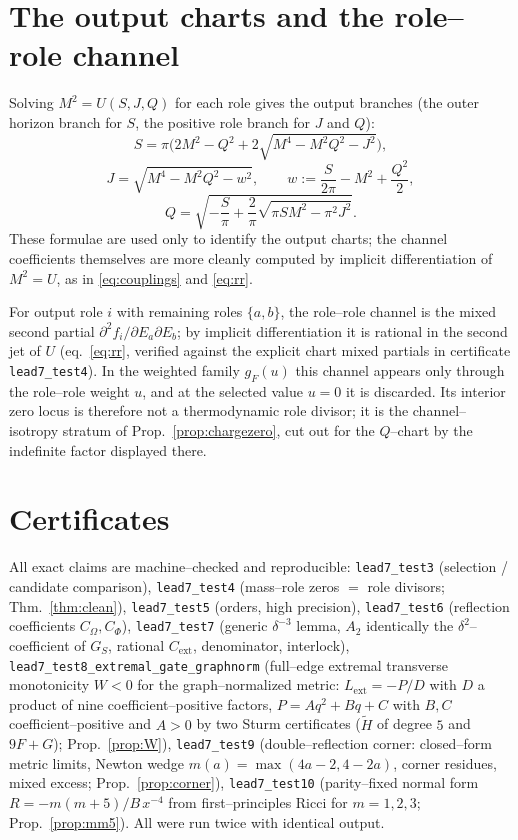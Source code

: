 \documentclass[11pt]{article}
\newcommand{\Rext}{C_{\mathrm{ext}}}
\begin{document}
\appendix
\section{The output charts and the role--role channel}
\label{app:charts}
Solving $M^2=U(S,J,Q)$ for each role gives the output branches (the outer horizon branch for
$S$, the positive role branch for $J$ and $Q$):
\[
S=\pi\Big(2M^2-Q^2+2\sqrt{M^4-M^2Q^2-J^2}\Big),
\]
\[
J=\sqrt{M^4-M^2Q^2-w^2},\qquad w:=\frac{S}{2\pi}-M^2+\frac{Q^2}{2},
\]
\[
Q=\sqrt{-\frac{S}{\pi}+\frac{2}{\pi}\sqrt{\pi S M^2-\pi^2J^2}}.
\]
These formulae are used only to identify the output charts; the channel coefficients
themselves are more cleanly computed by implicit differentiation of $M^2=U$, as in
\eqref{eq:couplings} and \eqref{eq:rr}.

For output role $i$ with remaining roles $\{a,b\}$, the role--role channel is the mixed second
partial $\partial^2 f_i/\partial E_a\partial E_b$; by implicit differentiation it is rational
in the second jet of $U$ (eq.~\eqref{eq:rr}, verified against the explicit chart mixed partials
in certificate \texttt{lead7\_test4}). In the weighted family $g_F(u)$ this channel appears
only through the role--role weight $u$, and at the selected value $u=0$ it is discarded. Its
interior zero locus is therefore not a thermodynamic role divisor; it is the channel--isotropy
stratum of Prop.~\ref{prop:chargezero}, cut out for the $Q$--chart by the indefinite factor
displayed there.

\section{Certificates}
\label{app:certs}
All exact claims are machine--checked and reproducible:
\texttt{lead7\_test3} (selection / candidate comparison),
\texttt{lead7\_test4} (mass--role zeros $=$ role divisors; Thm.~\ref{thm:clean}),
\texttt{lead7\_test5} (orders, high precision),
\texttt{lead7\_test6} (reflection coefficients $C_\Omega,C_\Phi$),
\texttt{lead7\_test7} (generic $\delta^{-3}$ lemma, $A_2$ identically the $\delta^2$--coefficient
of $G_S$, rational $\Rext$, denominator, interlock),
\texttt{lead7\_test8\_extremal\_gate\_graphnorm} (full--edge extremal transverse monotonicity
$W<0$ for the graph--normalized metric: $L_{\mathrm{ext}}=-P/D$ with $D$ a product of nine
coefficient--positive factors, $P=Aq^2+Bq+C$ with $B,C$ coefficient--positive and $A>0$ by two
Sturm certificates ($\widetilde H$ of degree $5$ and $9F+G$); Prop.~\ref{prop:W}),
\texttt{lead7\_test9} (double--reflection corner: closed--form metric limits, Newton wedge
$m(a)=\max(4a-2,4-2a)$, corner residues, mixed excess; Prop.~\ref{prop:corner}),
\texttt{lead7\_test10} (parity--fixed normal form $R=-m(m+5)/B\,x^{-4}$ from first--principles
Ricci for $m=1,2,3$; Prop.~\ref{prop:mm5}). All were run twice with identical output.
\end{document}
